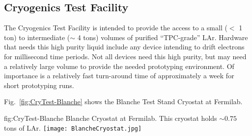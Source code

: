 \subsection{Cryogenics Test Facility}
\label{sec:fdsp-slow-cryo-test-facil}
The Cryogenics Test Facility is intended to provide the access to a small ($<$ \num{1} ton) to intermediate ($\sim$ \num{4} tons) volumes of purified ``TPC-grade'' LAr. Hardware that needs this high purity liquid include any device intending to drift electrons for millisecond time periods. Not all devices need this high purity, but may need a relatively large volume to provide the needed prototyping environment. Of importance is a relatively fast turn-around time of approximately a week for short prototyping runs.

Fig.~\ref{fig:CryTest-Blanche} shows the Blanche Test Stand Cryostat at Fermilab.

\begin{dunefigure}{fig:CryTest-Blanche} 
  {Blanche Cryostat at Fermilab. This cryostat holds $\sim 0.75$ tons of LAr.}
  \texttt{[image: BlancheCryostat.jpg]}%
\end{dunefigure}

